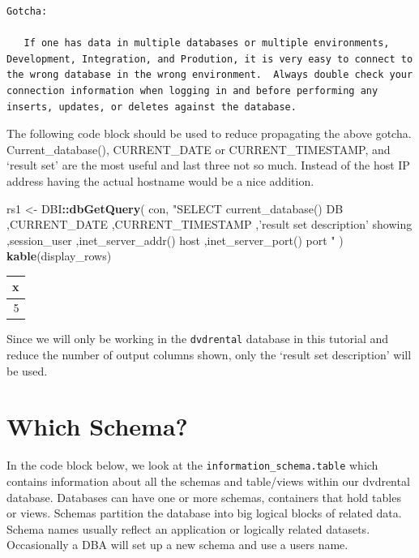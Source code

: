 \documentclass[]{book}
\newenvironment{Shaded}{\begin{snugshade}}{\end{snugshade}}
\newcommand{\KeywordTok}[1]{\textcolor[rgb]{0.13,0.29,0.53}{\textbf{#1}}}
\newcommand{\NormalTok}[1]{#1}
\newcommand{\OperatorTok}[1]{\textcolor[rgb]{0.81,0.36,0.00}{\textbf{#1}}}
\newcommand{\StringTok}[1]{\textcolor[rgb]{0.31,0.60,0.02}{#1}}
\theoremstyle{definition}
\theoremstyle{definition}
\theoremstyle{definition}
\theoremstyle{remark}
\begin{document}
\begin{verbatim}
Gotcha:

   If one has data in multiple databases or multiple environments, Development, Integration, and Prodution, it is very easy to connect to the wrong database in the wrong environment.  Always double check your connection information when logging in and before performing any inserts, updates, or deletes against the database.
\end{verbatim}

The following code block should be used to reduce propagating the above
gotcha. Current\_database(), CURRENT\_DATE or CURRENT\_TIMESTAMP, and
`result set' are the most useful and last three not so much. Instead of
the host IP address having the actual hostname would be a nice addition.

\begin{Shaded}
\begin{Highlighting}[]
\NormalTok{rs1 <-}
\StringTok{  }\NormalTok{DBI}\OperatorTok{::}\KeywordTok{dbGetQuery}\NormalTok{(}
\NormalTok{  con,}
  \StringTok{"SELECT current_database() DB}
\StringTok{         ,CURRENT_DATE}
\StringTok{         ,CURRENT_TIMESTAMP}
\StringTok{         ,'result set description' showing}
\StringTok{         ,session_user}
\StringTok{         ,inet_server_addr() host}
\StringTok{         ,inet_server_port() port}
\StringTok{  "}
\NormalTok{  )}
\KeywordTok{kable}\NormalTok{(display_rows)}
\end{Highlighting}
\end{Shaded}

\begin{tabular}{r}
\hline
x\\
\hline
5\\
\hline
\end{tabular}

Since we will only be working in the \texttt{dvdrental} database in this
tutorial and reduce the number of output columns shown, only the `result
set description' will be used.

\hypertarget{which-schema}{%
\section{Which Schema?}\label{which-schema}}

In the code block below, we look at the
\texttt{information\_schema.table} which contains information about all
the schemas and table/views within our dvdrental database. Databases can
have one or more schemas, containers that hold tables or views. Schemas
partition the database into big logical blocks of related data. Schema
names usually reflect an application or logically related datasets.
Occasionally a DBA will set up a new schema and use a users name.
\end{document}
